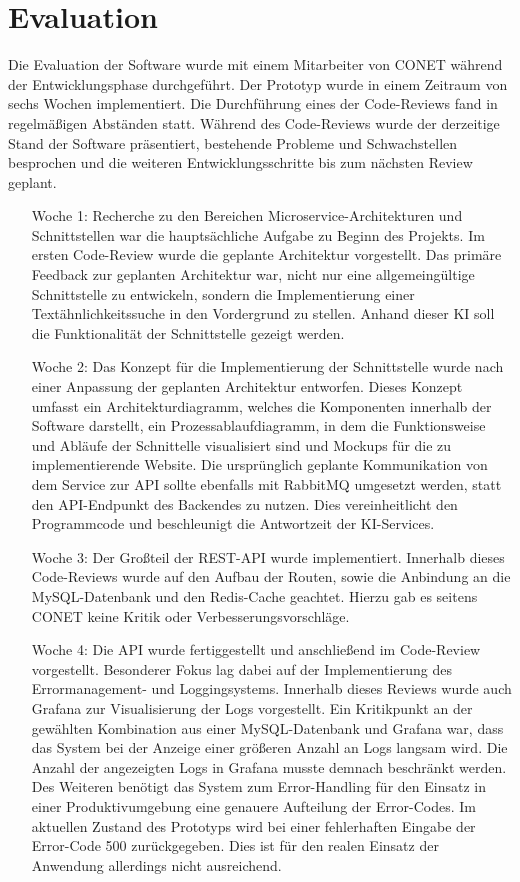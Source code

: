 \section{Evaluation}
Die Evaluation der Software wurde mit einem Mitarbeiter von CONET während der Entwicklungsphase durchgeführt. Der Prototyp wurde in einem Zeitraum von sechs Wochen implementiert. Die Durchführung eines der Code-Reviews fand in regelmäßigen Abständen statt. Während des Code-Reviews wurde der derzeitige Stand der Software präsentiert, bestehende Probleme und Schwachstellen besprochen und die weiteren Entwicklungsschritte bis zum nächsten Review geplant.

\begin{itemize}[leftmargin=6em]
\item [Woche 1:] Recherche zu den Bereichen Microservice-Architekturen und Schnittstellen war die hauptsächliche Aufgabe zu Beginn des Projekts. Im ersten Code-Review wurde die geplante Architektur vorgestellt. Das primäre Feedback zur geplanten Architektur war, nicht nur eine allgemeingültige Schnittstelle zu entwickeln, sondern die Implementierung einer Textähnlichkeitssuche in den Vordergrund zu stellen. Anhand dieser KI soll die Funktionalität der Schnittstelle gezeigt werden.
\item [Woche 2:] Das Konzept für die Implementierung der Schnittstelle wurde nach einer Anpassung der geplanten Architektur entworfen. Dieses Konzept umfasst ein Architekturdiagramm, welches die Komponenten innerhalb der Software darstellt, ein Prozessablaufdiagramm, in dem die Funktionsweise und Abläufe der Schnittelle visualisiert sind und Mockups für die zu implementierende Website. Die ursprünglich geplante Kommunikation von dem Service zur API sollte ebenfalls mit RabbitMQ umgesetzt werden, statt den API-Endpunkt des Backendes zu nutzen. Dies vereinheitlicht den Programmcode und beschleunigt die Antwortzeit der KI-Services.
\item [Woche 3:] Der Großteil der REST-API wurde implementiert. Innerhalb dieses Code-Reviews wurde auf den Aufbau der Routen, sowie die Anbindung an die MySQL-Datenbank und den Redis-Cache geachtet. Hierzu gab es seitens CONET keine Kritik oder Verbesserungsvorschläge.
\item [Woche 4:] Die API wurde fertiggestellt und anschließend im Code-Review vorgestellt. Besonderer Fokus lag dabei auf der Implementierung des Errormanagement- und Loggingsystems. Innerhalb dieses Reviews wurde auch Grafana zur Visualisierung der Logs vorgestellt. Ein Kritikpunkt an der gewählten Kombination aus einer MySQL-Datenbank und Grafana war, dass das System bei der Anzeige einer größeren Anzahl an Logs langsam wird. Die Anzahl der angezeigten Logs in Grafana musste demnach beschränkt werden. Des Weiteren benötigt das System zum Error-Handling für den Einsatz in einer Produktivumgebung eine genauere Aufteilung der Error-Codes. Im aktuellen Zustand des Prototyps wird bei einer fehlerhaften Eingabe der Error-Code 500 zurückgegeben. Dies ist für den realen Einsatz der Anwendung allerdings nicht ausreichend.

\end{itemize}
